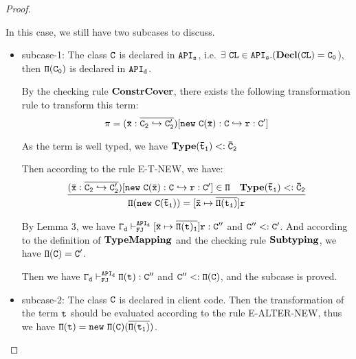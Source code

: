 \documentclass[letterpaper]{article}
\newcommand\type[1]{\mathbf{Type}(#1)}
\newcommand{\env}[2]{\vdash_{#1}^{#2}}
\begin{document}
\begin{proof}
\begin{itemize}
In this case, we still have two subcases to discuss.
  \begin{itemize}
    \item subcase-1: The class $\tt C$ is declared in $\tt API_s$, i.e. $\tt\exists~CL\in API_s.(\mathbf{Decl}(CL)=C_0$), then $\tt \Pi(C_0)$ is declared in $\tt API_d$.

    By the checking rule $\tt \mathbf{ConstrCover}$, there exists the following transformation rule to transform this term:
      $$\tt \pi=(\bar{x}:\overline{C_2 \hookrightarrow C'_2})[new~C(\bar{x}):C\hookrightarrow r:C']$$

    As the term is well typed, we have $\tt \type{\bar{t}_1}<:\bar{C}_2$

    Then according to the rule E-T-NEW, we have:
    \[
      \begin{array}{c c}
        \infer
        {\tt \Pi(new~C(\bar{t}_1))=[\bar{x}\mapsto \overline{\Pi(t_1)}]r}
        {\tt (\bar{x}:\overline{C_2 \hookrightarrow C'_2})[new~C(\bar{x}):C\hookrightarrow r:C']\in\Pi
        &\tt \mathbf{Type}(\bar{t}_1)<:\bar{C}_2
        }
      \end{array}
    \]

    By Lemma 3, we have $\tt \Gamma_d\env{FJ}{API_d}[\bar{x}\mapsto \overline{\Pi(t)_1}]r : C''$ and $\tt C'' <: C'$. And according to the definition of $\tt \mathbf{TypeMapping}$ and the checking rule $\tt \mathbf{Subtyping}$, we have $\tt \Pi(C)=C'$. 

    Then we have $\tt \Gamma_d\env{FJ}{API_d} \Pi(t):C''$ and $\tt C'' <: \Pi(C)$, and the subcase is proved.

    \item subcase-2: The class $\tt C$ is declared in client code. Then the transformation of the term $\tt t$ should be evaluated according to the rule E-ALTER-NEW, thus we have $\tt \Pi(t)=new~\Pi(C)(\overline{\Pi(t_1)})$.


\end{itemize}
\end{itemize}
\end{proof}
\end{document}
